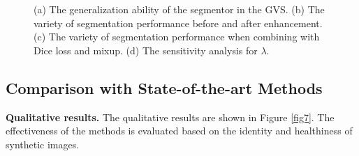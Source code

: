 \documentclass[journal,twoside,web]{ieeecolor}
\begin{document}
\begin{figure}
	\centering
	\caption{(a) The generalization ability of the segmentor in the GVS. (b) The variety of segmentation performance before and after enhancement. (c) The variety of segmentation performance when combining with Dice loss and mixup. (d) The sensitivity analysis for $\lambda$.}
	\label{fig9}
\end{figure}

\subsection{Comparison with State-of-the-art Methods} \label{sec55}
\noindent\textbf{Qualitative results.} The qualitative results are shown in Figure \ref{fig7}. The effectiveness of the methods is evaluated based on the identity and healthiness of synthetic images.
\end{document}
